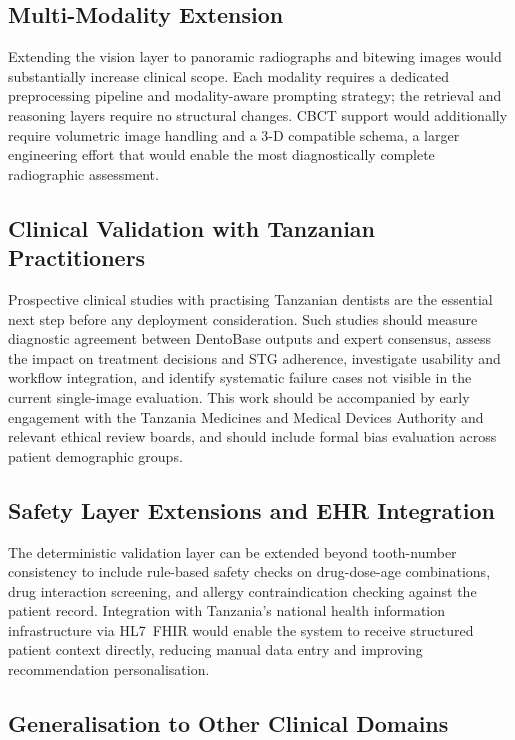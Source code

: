 \documentclass[12pt,a4paper]{report}
\begin{document}
	\subsection{Multi-Modality Extension}
	
	Extending the vision layer to panoramic radiographs and bitewing images would
	substantially increase clinical scope. Each modality requires a dedicated
	preprocessing pipeline and modality-aware prompting strategy; the retrieval
	and reasoning layers require no structural changes. CBCT support would
	additionally require volumetric image handling and a 3-D compatible schema,
	a larger engineering effort that would enable the most diagnostically complete
	radiographic assessment.
	
	\subsection{Clinical Validation with Tanzanian Practitioners}
	
	Prospective clinical studies with practising Tanzanian dentists are the
	essential next step before any deployment consideration. Such studies should
	measure diagnostic agreement between DentoBase outputs and expert consensus,
	assess the impact on treatment decisions and STG adherence, investigate
	usability and workflow integration, and identify systematic failure cases
	not visible in the current single-image evaluation. This work should be
	accompanied by early engagement with the Tanzania Medicines and Medical Devices
	Authority and relevant ethical review boards, and should include formal bias
	evaluation across patient demographic groups.
	
	\subsection{Safety Layer Extensions and EHR Integration}
	
	The deterministic validation layer can be extended beyond tooth-number
	consistency to include rule-based safety checks on drug-dose-age combinations,
	drug interaction screening, and allergy contraindication checking against the
	patient record. Integration with Tanzania's national health information
	infrastructure via HL7~FHIR would enable the system to receive structured
	patient context directly, reducing manual data entry and improving recommendation
	personalisation.
	
	\subsection{Generalisation to Other Clinical Domains}
	
\end{document}
